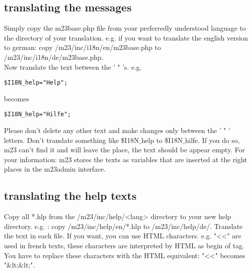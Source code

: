 \subsection{translating the messages}
Simply copy the m23base.php file from your preferredly understood language to the directory of your translation. e.g. if you want to translate the english version to german: copy /m23/inc/i18n/en/m23base.php to /m23/inc/i18n/de/m23base.php.\\
Now translate the text between the ' " 's.
e.g.
\begin{verbatim}
$I18N_help="Help";
\end{verbatim}
becomes
\begin{verbatim}
$I18N_help="Hilfe";
\end{verbatim}
Please don't delete any other text and make changes only between the ' " ' letters. Don't translate something like \$I18N$\_$help to \$I18N$\_$hilfe. If you do so, m23 can't find it and will leave the place, the text should be appear empty. For your information: m23 stores the texts as variables that are inserted at the right places in the m23admin interface.
\subsection{translating the help texts}
Copy all *.hlp from the /m23/inc/help/<lang> directory to your new help directory. e.g. : copy /m23/inc/help/en/*.hlp to /m23/inc/help/de/. Translate the text in each file. If you want, you can use HTML characters. e.g. "<<" are used in french texts, these characters are interpreted by HTML as begin of tag. You have to replace these characters with the HTML equivalent: "<<" becomes "\&lt;\&lt;".\\
